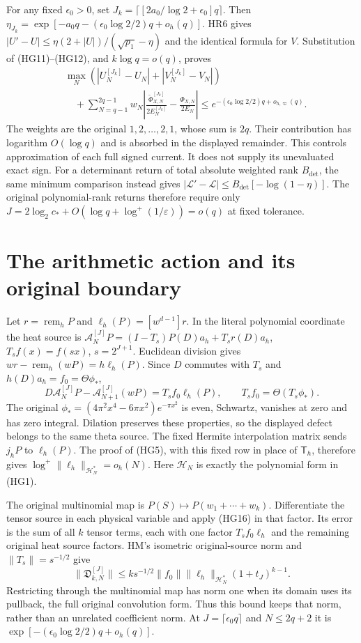 \documentclass[11pt]{article}
\begin{document}
For any fixed $\epsilon_0>0$, set
$J_k=\lceil[2a_0/\log2+\epsilon_0]q\rceil$.
Then $\eta_{J_k}=\exp[-a_0q-(\epsilon_0\log2/2)q+o_h(q)]$.
HR6 gives
$|U'-U|\le\eta(2+|U|)/(\sqrt{p_1}-\eta)$ and the identical
formula for $V$. Substitution of (HG11)--(HG12), and $k\log q=o(q)$,
proves
\[
 \begin{aligned}
 &\max_N(|U_N^{[J_k]}-U_N|+|V_N^{[J_k]}-V_N|)\\
 &\quad+\sum_{N=q-1}^{2q-1}w_N
 \left|\frac{\widetilde\Phi_{X,N}^{[J_k]}}{2E_N^{[J_k]}}
                  -\frac{\Phi_{X,N}}{2E_N}\right|
 \le e^{-(\epsilon_0\log2/2)q+o_{h,\varpi}(q)} .
 \end{aligned}\tag{HG15}
\]
The weights are the original $1,2,\ldots,2,1$, whose sum is $2q$.
Their contribution has logarithm $O(\log q)$ and is absorbed in the
displayed remainder. This controls approximation of each full signed
current. It does not supply its unevaluated exact sign.
For a determinant return of total absolute weighted rank $B_{\det}$,
the same minimum comparison instead gives
$|\mathcal L'-\mathcal L|\le B_{\det}[-\log(1-\eta)]$.
The original polynomial-rank returns therefore require only
$J=2\log_2c_*+O(\log q+\log^+(1/\varepsilon))=o(q)$ at fixed tolerance.

\section{The arithmetic action and its original boundary}
Let $r=\operatorname{rem}_hP$ and
$\ell_h(P)=[w^{d-1}]r$. In the literal polynomial coordinate the
heat source is
$\mathcal A_N^{[J]}P=(I-T_s)P(D)a_h+T_sr(D)a_h$,
$T_sf(x)=f(sx)$, $s=2^{J+1}$.
Euclidean division gives
$wr-\operatorname{rem}_h(wP)=h\ell_h(P)$.
Since $D$ commutes with $T_s$ and $h(D)a_h=f_0=\Theta\phi_*$,
\[
 D\mathcal A_N^{[J]}P-\mathcal A_{N+1}^{[J]}(wP)
             =T_sf_0\ell_h(P),\qquad T_sf_0=\Theta(T_s\phi_*).
 \tag{HG16}
\]
The original $\phi_*=(4\pi^2x^4-6\pi x^2)e^{-\pi x^2}$ is even,
Schwartz, vanishes at zero and has zero integral. Dilation preserves
these properties, so the displayed defect belongs to the same theta
source. The fixed Hermite interpolation matrix sends $j_hP$ to
$\ell_h(P)$. The proof of (HG5), with this fixed row in place of
$\mathsf T_h$, therefore gives
$\log^+\|\ell_h\|_{\mathcal H_N^*}=o_h(N)$.
Here $\mathcal H_N$ is exactly the polynomial form in (HG1).

The original multinomial map is
$P(S)\mapsto P(w_1+\cdots+w_k)$. Differentiate the tensor source
in each physical variable and apply (HG16) in that factor.
Its error is the sum of all $k$ tensor terms, each with one factor
$T_sf_0\ell_h$ and the remaining original heat source factors.
HM's isometric original-source norm and $\|T_s\|=s^{-1/2}$ give
\[
 \|\mathfrak D_{k,N}^{[J]}\|
 \le k s^{-1/2}\|f_0\|\|\ell_h\|_{\mathcal H_N^*}
                  (1+t_J)^{k-1}.\tag{HG17}
\]
Restricting through the multinomial map has norm one when its domain
uses its pullback, the full original convolution form. Thus this
bound keeps that norm, rather than an unrelated coefficient norm.
At $J=\lceil\epsilon_0q\rceil$ and $N\le2q+2$ it is
$\exp[-(\epsilon_0\log2/2)q+o_h(q)]$.
\end{document}
